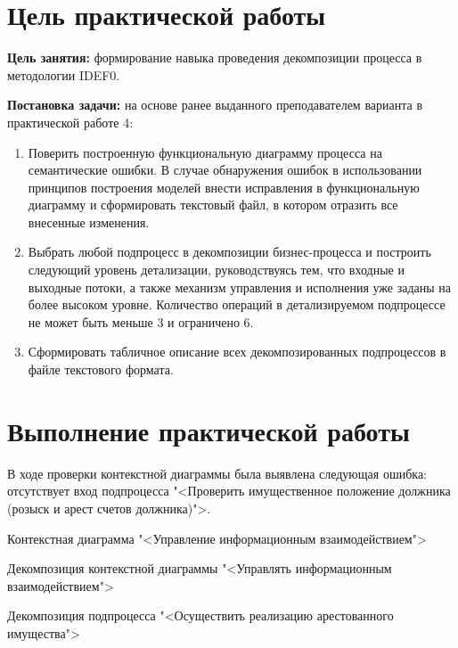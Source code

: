 \graphicspath{{./sixth/img/}}

\section{Цель практической работы}
\textbf{Цель занятия:}
формирование навыка проведения декомпозиции 
процесса в методологии IDEF0.\par
\textbf{Постановка задачи:}
на основе ранее выданного преподавателем 
варианта в практической работе 4:

\begin{enumerate}
	\item Поверить построенную функциональную диаграмму процесса на 
		семантические ошибки. В случае обнаружения ошибок в использовании 
		принципов построения моделей внести исправления в функциональную 
		диаграмму и сформировать текстовый файл, в котором отразить
		все внесенные изменения.
	\item Выбрать любой подпроцесс в декомпозиции бизнес-процесса и 
		построить следующий уровень детализации, руководствуясь тем,
		что входные и выходные потоки, а также механизм управления
		и исполнения уже заданы на более высоком уровне.
		Количество операций в детализируемом подпроцессе не 
		может быть меньше 3 и ограничено 6.
	\item Сформировать табличное описание всех декомпозированных 
		подпроцессов в файле текстового формата.
\end{enumerate}

\section{Выполнение практической работы}
В ходе проверки контекстной диаграммы была выявлена следующая 
ошибка: отсутствует вход подпроцесса
"<Проверить имущественное положение должника
(розыск и арест счетов должника)">.

\begin{image}
	\caption{Контекстная диаграмма "<Управление информационным
		взаимодействием">}
	\label{fig:IDEF0:a0}
\end{image}

\begin{image}
	\caption{Декомпозиция контекстной диаграммы "<Управлять информационным
		взаимодействием">}
	\label{fig:IDEF0:a0:d}
\end{image}

\begin{image}
	\caption{Декомпозиция подпроцесса "<Осуществить реализацию
		арестованного имущества">}
	\label{fig:IDEF0:a4}
\end{image}


